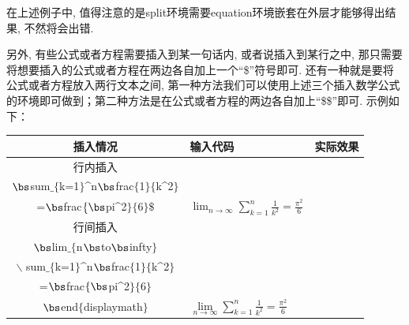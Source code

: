 在上述例子中, 值得注意的是split环境需要equation环境嵌套在外层才能够得出结果, 不然将会出错.


另外, 有些公式或者方程需要插入到某一句话内, 或者说插入到某行之中, 那只需要将想要插入的公式或者方程在两边各自加上一个“\$”符号即可. 还有一种就是要将公式或者方程放入两行文本之间, 第一种方法我们可以使用上述三个插入数学公式的环境即可做到；第二种方法是在公式或者方程的两边各自加上“\$\$”即可. 示例如下：
\def\parlen{180pt}
\begin{center}\renewcommand\arraystretch{1.2} 
    \begin{tabular}{c|l|c}
    插入情况& 输入代码 & 实际效果 \\\hline
    行内插入
        &\makecell[l]{%
          \$ $\bs$lim$\_\{$n$\bs$to$\bs$infty$\}$\\[-5pt]
          $\bs$sum$\_\{$k=1$\}$\^{}n$\bs$frac$\{$1$\}\{$k\^{}2$\}$\\[-5pt]
          =$\bs$frac$\{\bs$pi\^{}2$\}\{$6$\}\$$}
        &$\lim_{n\to\infty}\sum_{k=1}^n\frac{1}{k^2}
                =\frac{\pi^2}{6}$\\ \hline
    行间插入&
        \makecell[l]{
           $\bs$begin$\{$displaymath$\}$\\[-5pt]
           $\bs$lim$\_\{$n$\bs$to$\bs$infty$\}$\\ [-5pt] \hspace{-10pt}$\backslash$ sum$\_\{$k=1$\}$\^{}n$\bs$frac$\{$1$\}\{$k\^{}2$\}$\\[-5pt]
            =$\bs$frac$\{\bs$pi\^{}2$\}\{$6$\}$\\[-5pt]
            $\bs$end$\{$displaymath$\}$}
            &$\lim\limits_{n\to\infty}
            \displaystyle\sum_{k=1}^n\frac{1}{k^2}
            =\frac{\pi^2}{6}$\\ \hline
    \end{tabular}
\end{center}
\medskip

